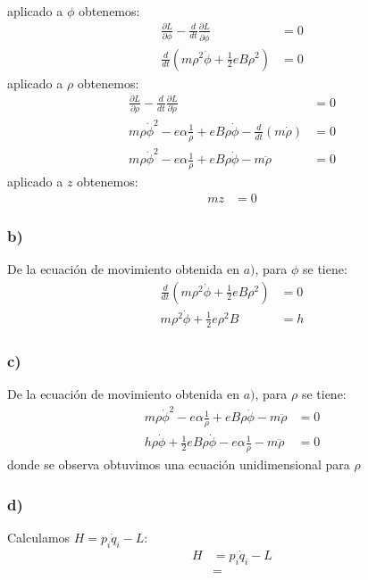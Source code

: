\documentclass{article}
\begin{document}
\begin{tcolorbox}[breakable]
\begin{align*}
    \end{align*}
    aplicado a $\phi$ obtenemos:
    \begin{align*}
        \frac{\partial L}{\partial \phi} - \frac{d}{dt}\frac{\partial L}{\partial \dot{\phi}} &= 0 \\
        \frac{d}{dt}(m\rho^2\dot{\phi} + \frac{1}{2}eB\rho^2) &= 0
     \end{align*}
     aplicado a $\rho$ obtenemos:
    \begin{align*}
        \frac{\partial L}{\partial \rho} - \frac{d}{dt}\frac{\partial L}{\partial \dot{\rho}} &= 0 \\
        m\rho \dot{\phi}^2 - e\alpha \frac{1}{\rho} + eB\rho \dot{\phi} - \frac{d}{dt}(m\dot{\rho}) &= 0 \\
        m\rho \dot{\phi}^2 - e\alpha \frac{1}{\rho} + eB\rho \dot{\phi} - m\ddot{\rho} &= 0 
    \end{align*}
    aplicado a $z$ obtenemos:
    \begin{align*}
        mz &= 0
    \end{align*}
    \subsubsection*{b)}
    De la ecuación de movimiento obtenida en $a)$, para $\phi$ se tiene:
    \begin{align*}
        \frac{d}{dt}(m\rho^2\dot{\phi} + \frac{1}{2}eB\rho^2) &= 0 \\
        m\rho^2\dot{\phi} + \frac{1}{2}e\rho^2B &= h
    \end{align*}
    \subsubsection*{c)}
    De la ecuación de movimiento obtenida en $a)$, para $\rho$ se tiene:
    \begin{align*}
        m\rho \dot{\phi}^2 - e\alpha \frac{1}{\rho} + eB\rho \dot{\phi} - m\ddot{\rho} &= 0 \\
        h\rho \dot{\phi} +  \frac{1}{2}eB\rho \dot{\phi} - e\alpha \frac{1}{\rho}  - m\ddot{\rho} &= 0
    \end{align*}
    donde se observa obtuvimos una ecuación unidimensional para $\rho$
    \subsubsection*{d)}
    Calculamos $H = p_i\dot{q}_i - L$:
    \begin{align*}
        H 
        &= p_i\dot{q}_i - L \\
        &= 
    \end{align*}

\end{tcolorbox}
\newpage
\end{document}

